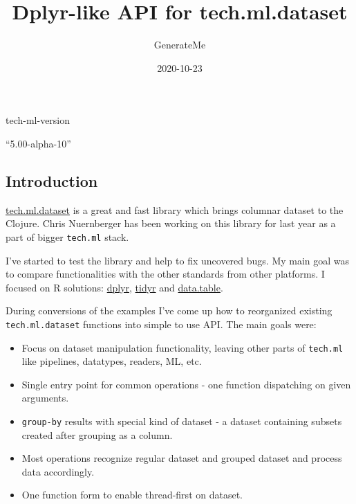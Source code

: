 \documentclass[]{article}
\title{Dplyr-like API for tech.ml.dataset}
\author{GenerateMe}
\date{2020-10-23}
\newenvironment{Shaded}{\begin{snugshade}}{\end{snugshade}}
\newcommand{\NormalTok}[1]{#1}
\providecommand{\tightlist}{%
  \setlength{\itemsep}{0pt}\setlength{\parskip}{0pt}}
\begin{document}
\maketitle

\begin{Shaded}
\begin{Highlighting}[]
\NormalTok{tech-ml-version}
\end{Highlighting}
\end{Shaded}

``5.00-alpha-10''

\hypertarget{introduction}{%
\subsection{Introduction}\label{introduction}}

\href{https://github.com/techascent/tech.ml.dataset}{tech.ml.dataset} is
a great and fast library which brings columnar dataset to the Clojure.
Chris Nuernberger has been working on this library for last year as a
part of bigger \texttt{tech.ml} stack.

I've started to test the library and help to fix uncovered bugs. My main
goal was to compare functionalities with the other standards from other
platforms. I focused on R solutions:
\href{https://dplyr.tidyverse.org/}{dplyr},
\href{https://tidyr.tidyverse.org/}{tidyr} and
\href{https://rdatatable.gitlab.io/data.table/}{data.table}.

During conversions of the examples I've come up how to reorganized
existing \texttt{tech.ml.dataset} functions into simple to use API. The
main goals were:

\begin{itemize}
\tightlist
\item
  Focus on dataset manipulation functionality, leaving other parts of
  \texttt{tech.ml} like pipelines, datatypes, readers, ML, etc.
\item
  Single entry point for common operations - one function dispatching on
  given arguments.
\item
  \texttt{group-by} results with special kind of dataset - a dataset
  containing subsets created after grouping as a column.
\item
  Most operations recognize regular dataset and grouped dataset and
  process data accordingly.
\item
  One function form to enable thread-first on dataset.
\end{itemize}
\end{document}
